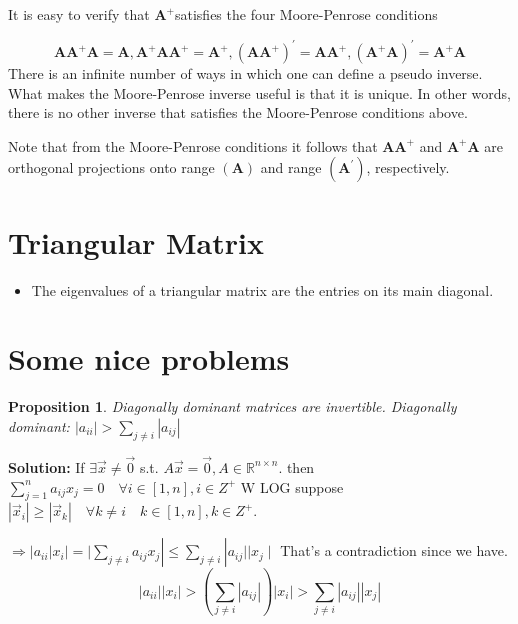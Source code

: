 \documentclass[14pt]{article}
\newtheorem{proposition}[theorem]{Proposition}
\theoremstyle{definition}
\newenvironment{solution}
{\color{C2}\begin{framed}\begingroup\textbf{Solution:} }
  {\endgroup\end{framed}}
\theoremstyle{remark}
\newenvironment{remark}
  {\pushQED{\qed}\renewcommand{\qedsymbol}{$\triangle$}\remarkx}
  {\popQED\endremarkx}
\begin{document}
\begin{multicols*}{2}
    It is easy to verify that $\mathbf{A}^{+}$satisfies the four Moore-Penrose conditions

    $$
    \mathbf{A} \mathbf{A}^{+} \mathbf{A} =\mathbf{A}, \mathbf{A}^{+} \mathbf{A} \mathbf{A}^{+} =\mathbf{A}^{+},
    \left(\mathbf{A A}^{+}\right)^{\prime}  =\mathbf{A A}^{+}, \left(\mathbf{A}^{+} \mathbf{A}\right)^{\prime} =\mathbf{A}^{+} \mathbf{A}
    $$
    \begin{remark}
        There is an infinite number of ways in which one can define a pseudo inverse. 
        What makes the Moore-Penrose inverse useful is that it is {\color{blue}unique}. 
        In other words, there is no other inverse that satisfies the Moore-Penrose conditions above.

    Note that from the Moore-Penrose conditions it follows that $\mathbf{A A}^{+}$ and $\mathbf{A}^{+} \mathbf{A}$ are orthogonal projections onto range $(\mathbf{A})$ and range $\left(\mathbf{A}^{\prime}\right)$, respectively.

    \end{remark}
    \end{multicols*}


\headrule

\section{Triangular Matrix}
\begin{itemize}
    \item The eigenvalues of a triangular matrix are the entries on its main diagonal.
\end{itemize}

\headrule

\section{Some nice problems}
\begin{proposition}
    Diagonally dominant matrices are invertible.
    Diagonally dominant: $\left|a_{i i}\right|>\sum_{j \neq i}\left|a_{i j}\right|$
\end{proposition}
\begin{solution}
    If $\exists \vec{x} \neq \overrightarrow{0}$ s.t. $A \vec{x}=\overrightarrow{0}, A \in \mathbb{R}^{n \times n}$.
    then $\sum_{j=1}^n a_{i j} x_j=0 \quad \forall i \in[1, n], i \in Z^{+}$
    W LOG suppose $\left|\vec{x}_i\right| \ge\left|\vec{x}_k\right| \quad \forall k \neq i \quad k \in[1, n], k \in Z^{+}$.

    $\Rightarrow\left|a_{i i}\right| x_i|=| \sum_{j \neq i} a_{i j} x_j\left|\leqslant \sum_{j \neq i}\right| a_{i j}|| x_j \mid$
    That's a contradiction since we have.
    $$
        \left|a_{ii}\right|\left|x_i\right|>\left(\sum_{j\ne i}\left|a_{i j}\right|\right)\left|x_i\right|>\sum_{j \neq i}\left|a_{i j}\right|\left|x_j\right|
    $$
\end{solution}
\end{document}
